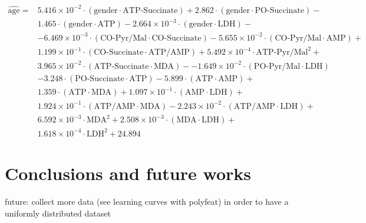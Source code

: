 \begin{equation}\label{eq:frassoni_lasso}
\begin{aligned}
\hat{\text{age}} = {} & 5.416\times 10^{-2} \cdot (\text{gender} \cdot \text{ATP-Succinate}) +
2.862 \cdot (\text{gender} \cdot \text{PO-Succinate}) -\\
& 1.465 \cdot (\text{gender} \cdot \text{ATP}) 
-2.664\times 10^{-3} \cdot (\text{gender} \cdot \text{LDH}) - \\
& -6.469\times 10^{-3} \cdot (\text{CO-Pyr/Mal} \cdot \text{CO-Succinate})
-5.655\times 10^{-2} \cdot (\text{CO-Pyr/Mal} \cdot \text{AMP}) + \\
& 1.199\times 10^{-1} \cdot (\text{CO-Succinate} \cdot \text{ATP/AMP}) +
5.492\times 10^{-4} \cdot \text{ATP-Pyr/Mal}^2 + \\
& 3.965\times 10^{-2} \cdot (\text{ATP-Succinate} \cdot \text{MDA}) -
-1.649\times 10^{-2} \cdot (\text{PO-Pyr/Mal} \cdot \text{LDH}) \\
& -3.248 \cdot (\text{PO-Succinate} \cdot \text{ATP})
-5.899 \cdot (\text{ATP} \cdot \text{AMP}) + \\
& 1.359 \cdot (\text{ATP} \cdot \text{MDA}) +
1.097\times 10^{-1} \cdot (\text{AMP} \cdot \text{LDH}) + \\
&1.924\times 10^{-1} \cdot (\text{ATP/AMP} \cdot \text{MDA})
-2.243\times 10^{-2} \cdot (\text{ATP/AMP} \cdot \text{LDH}) + \\
& 6.592\times 10^{-3} \cdot \text{MDA}^2 +
2.508\times 10^{-3} \cdot (\text{MDA} \cdot \text{LDH}) + \\
& 1.618\times 10^{-4} \cdot \text{LDH}^2 + 24.894
\end{aligned}
\end{equation}



\section{Conclusions and future works} \label{sec:frassoni_conclusions}

future: collect more data (see learning curves with polyfeat) in order to have a uniformly distributed dataset

